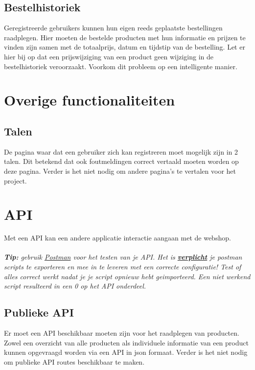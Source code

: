 \documentclass{article}
\begin{document}
\subsection{Bestelhistoriek}
Geregistreerde gebruikers kunnen hun eigen reeds geplaatste bestellingen raadplegen. Hier moeten de bestelde producten met hun informatie en prijzen te vinden zijn samen met de totaalprijs, datum en tijdstip van de bestelling. Let er hier bij op dat een prijswijziging van een product geen wijziging in de bestelhistoriek veroorzaakt. Voorkom dit probleem op een intelligente manier.


\section{Overige functionaliteiten}
\subsection{Talen}
De pagina waar dat een gebruiker zich kan registreren moet mogelijk zijn in 2 talen. Dit betekend dat ook foutmeldingen correct vertaald moeten worden op deze pagina. Verder is het niet nodig om andere pagina's te vertalen voor het project.

\section{API}
Met een API kan een andere applicatie interactie aangaan met de webshop. 
\\
\\
\textit{\textbf{Tip:} gebruik \href{https://www.postman.com/downloads/}{Postman} voor het testen van je API. Het is \underline{\textbf{verplicht}} je postman scripts te exporteren en mee in te leveren met een correcte configuratie! Test of alles correct werkt nadat je je script opnieuw hebt geimporteerd. Een niet werkend script resulteerd in een 0 op het API onderdeel.}

\subsection{Publieke API}
Er moet een API beschikbaar moeten zijn voor het raadplegen van producten. Zowel een overzicht van alle producten als individuele informatie van een product kunnen opgevraagd worden via een API in json formaat. Verder is het niet nodig om publieke API routes beschikbaar te maken.
\end{document}
